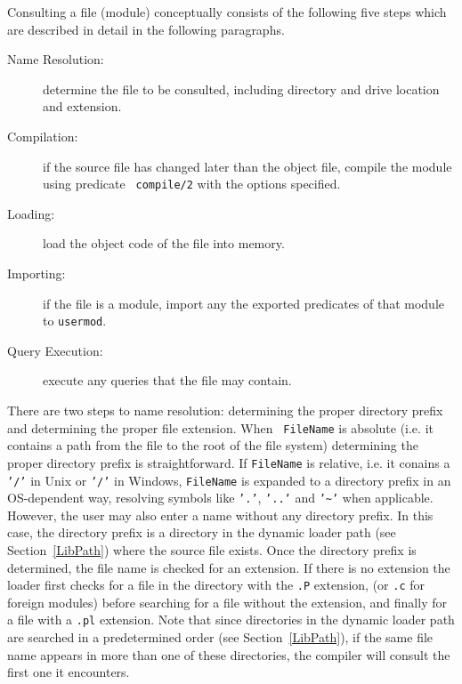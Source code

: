 Consulting a file (module) conceptually consists of the following five
steps which are described in detail in the following paragraphs.
\begin{description}
\item[Name Resolution:] determine the file to be consulted, including
	directory and drive location and extension.
\item[Compilation:]  if the source file has changed later than the
	object file, compile the module using predicate {\tt
            compile/2} with the options specified.
\item[Loading:] load the object code of the file into memory. 
\item[Importing:] if the file is a module, import any the exported
	predicates of that module to {\tt usermod}.
\item[Query Execution:] execute any queries that the file may contain.
\end{description}

There are two steps to name resolution: determining the proper
directory prefix and determining the proper file extension.  When {\tt
FileName} is absolute (i.e. it contains a path from the file to the
root of the file system) determining the proper directory prefix is
straightforward.  If {\tt FileName} is relative, i.e. it conains a
{\tt '/'} in Unix or {\tt '/'} in Windows, {\tt FileName} is expanded
to a directory prefix in an OS-dependent way, resolving symbols like
{\tt '.'}, {\tt '..'} and {\tt '\~{}'} when applicable.  However, the
user may also enter a name without any directory prefix. In this case,
the directory prefix is a directory in the dynamic loader path (see
Section~\ref{LibPath}) where the source file exists.  Once the
directory prefix is determined, the file name is checked for an
extension.  If there is no extension the loader first checks for a
file in the directory with the {\tt .P} extension, (or {\tt .c} for
foreign modules) before searching for a file without the extension,
and finally for a file with a {\tt .pl} extension.  Note that since
directories in the dynamic loader path are searched in a predetermined
order (see Section~\ref{LibPath}), if the same file name appears in
more than one of these directories, the compiler will consult the
first one it encounters.

